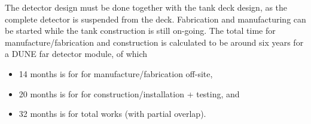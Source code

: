 The detector design must be done together with the tank deck design,
as the complete detector is suspended from the deck.  Fabrication and
manufacturing can be started while the tank construction is still
on-going.  The total time for manufacture/fabrication and construction
is calculated to be around six years for a DUNE far detector module, of which
\begin{itemize}
\item{14 months	is for	for manufacture/fabrication off-site, }
\item{20 months	is for	for construction/installation + testing, and }
\item{32 months	is for	total works (with partial overlap). }
\end{itemize}
